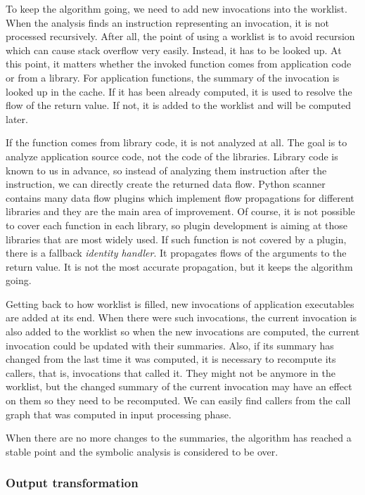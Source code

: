 To keep the algorithm going, we need to add new invocations into the worklist. When the analysis finds an instruction representing an invocation, it is not processed recursively. After all, the point of using a worklist is to avoid recursion which can cause stack overflow very easily. Instead, it has to be looked up. At this point, it matters whether the invoked function comes from application code or from a library. For application functions, the summary of the invocation is looked up in the cache. If it has been already computed, it is used to resolve the flow of the return value. If not, it is added to the worklist and will be computed later.
\par
If the function comes from library code, it is not analyzed at all. The goal is to analyze application source code, not the code of the libraries. Library code is known to us in advance, so instead of analyzing them instruction after the instruction, we can directly create the returned data flow. Python scanner contains many data flow plugins which implement flow propagations for different libraries and they are the main area of improvement. Of course, it is not possible to cover each function in each library, so plugin development is aiming at those libraries that are most widely used. If such function is not covered by a plugin, there is a fallback \textit{identity handler}. It propagates flows of the arguments to the return value. It is not the most accurate propagation, but it keeps the algorithm going.
\par
Getting back to how worklist is filled, new invocations of application executables are added at its end. When there were such invocations, the current invocation is also added to the worklist so when the new invocations are computed, the current invocation could be updated with their summaries. Also, if its summary has changed from the last time it was computed, it is necessary to recompute its callers, that is, invocations that called it. They might not be anymore in the worklist, but the changed summary of the current invocation may have an effect on them so they need to be recomputed. We can easily find callers from the call graph that was computed in input processing phase.
\par
When there are no more changes to the summaries, the algorithm has reached a stable point and the symbolic analysis is considered to be over.

\subsubsection{Output transformation}


